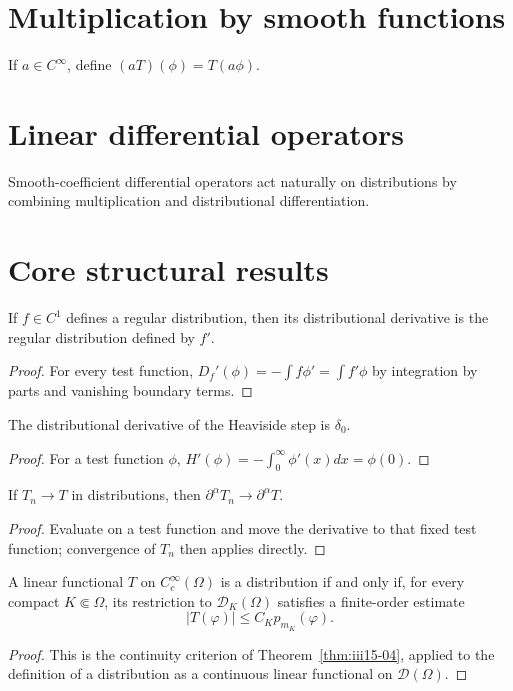 \section{Multiplication by smooth functions}
If $a\in C^\infty$, define $(aT)(\phi)=T(a\phi)$.

\section{Linear differential operators}
Smooth-coefficient differential operators act naturally on distributions by combining multiplication and distributional differentiation.

\section{Core structural results}

\begin{theorem}\label{thm:iii16-01}
If $f\in C^1$ defines a regular distribution, then its distributional derivative is the regular distribution defined by $f'$.
\begin{proof}
For every test function, $D_f'(\phi)=-\int f\phi'=\int f'\phi$ by integration by parts and vanishing boundary terms.
\end{proof}
\end{theorem}

\begin{theorem}\label{thm:iii16-02}
The distributional derivative of the Heaviside step is $\delta_0$.
\begin{proof}
For a test function $\phi$, $H'(\phi)=-\int_0^\infty\phi'(x)dx=\phi(0)$.
\end{proof}
\end{theorem}

\begin{theorem}\label{thm:iii16-03}
If $T_n\to T$ in distributions, then $\partial^\alpha T_n\to\partial^\alpha T$.
\begin{proof}
Evaluate on a test function and move the derivative to that fixed test function; convergence of $T_n$ then applies directly.
\end{proof}
\end{theorem}

\begin{theorem}\label{thm:iii16-04}
A linear functional \(T\) on \(C_c^\infty(\Omega)\) is a distribution if and
only if, for every compact \(K\Subset\Omega\), its restriction to
\(\mathcal D_K(\Omega)\) satisfies a finite-order estimate
\[
|T(\varphi)|\le C_K p_{m_K}(\varphi).
\]
\begin{proof}
This is the continuity criterion of
Theorem~\ref{thm:iii15-04}, applied to the definition of a distribution as a
continuous linear functional on \(\mathcal D(\Omega)\).
\end{proof}
\end{theorem}

